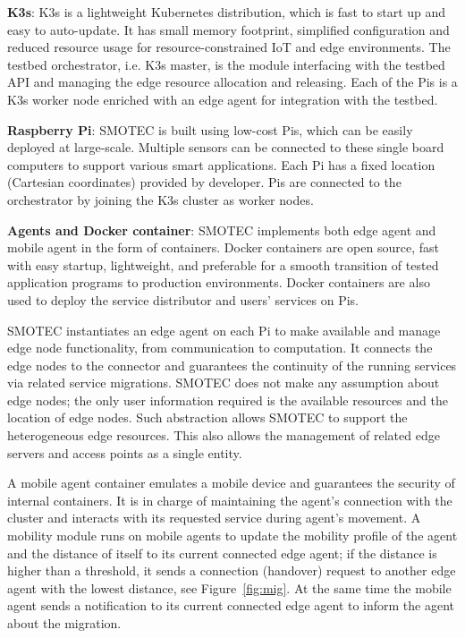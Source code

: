 \documentclass[conference]{IEEEtran}
\begin{document}
\noindent \textbf{K3s}: K3s is a lightweight Kubernetes distribution, which is fast to start up and easy to auto-update. It has small memory footprint, simplified configuration and reduced resource usage for resource-constrained IoT and edge environments. The testbed orchestrator, i.e. K3s master, is the module interfacing with the testbed API and managing the edge resource allocation and releasing. Each of the Pis is a K3s worker node enriched with an edge agent for integration with the testbed. 

\noindent \textbf{Raspberry Pi}: SMOTEC is built using low-cost Pis, which can be easily deployed at large-scale. Multiple sensors can be connected to these single board computers to support various smart applications. Each Pi has a fixed location (Cartesian coordinates) provided by developer. Pis are connected to the orchestrator by joining the K3s cluster as worker nodes.

\noindent \textbf{Agents and Docker container}: SMOTEC implements both edge agent and mobile agent in the form of containers. Docker containers are open source, fast with easy startup, lightweight, and preferable for a smooth transition of tested application programs to production environments. Docker containers are also used to deploy the service distributor and users' services on Pis. 

\par SMOTEC instantiates an edge agent on each Pi to make available and manage edge node functionality, from communication to computation. It connects the edge nodes to the connector and guarantees the continuity of the running services via related service migrations. SMOTEC does not make any assumption about edge nodes; the only user information required is the available resources and the location of edge nodes. Such abstraction allows SMOTEC to support the heterogeneous edge resources. This also allows the management of related edge servers and access points as a single entity.
\par A mobile agent container emulates a mobile device and guarantees the security of internal containers. It is in charge of maintaining the agent's connection with the cluster and interacts with its requested service during agent's movement. A mobility module runs on mobile agents to update the mobility profile of the agent and the distance of itself to its current connected edge agent; if the distance is higher than a threshold, it sends a connection (handover) request to another edge agent with the lowest distance, see Figure~\ref{fig:mig}. At the same time the mobile agent sends a notification to its current connected edge agent to inform the agent about the migration.
\end{document}
